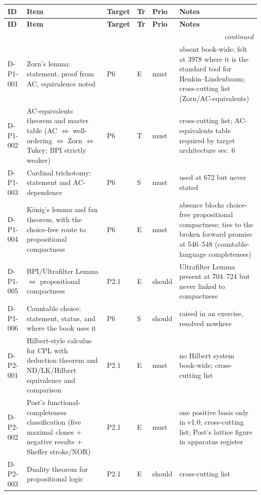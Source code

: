 \begingroup\scriptsize\setlength{\tabcolsep}{3pt}
\begin{longtable}{@{}p{0.62in}p{2.6in}p{0.75in}p{0.22in}p{0.42in}p{1.85in}@{}}
\toprule
\textbf{ID} & \textbf{Item} & \textbf{Target} & \textbf{Tr} & \textbf{Prio} & \textbf{Notes} \\
\midrule
\endfirsthead
\toprule
\textbf{ID} & \textbf{Item} & \textbf{Target} & \textbf{Tr} & \textbf{Prio} & \textbf{Notes} \\
\midrule
\endhead
\midrule\multicolumn{6}{r}{\emph{continued}}\\\endfoot
\bottomrule\endlastfoot
D-P1-001 & Zorn's lemma: statement, proof from AC, equivalence noted & P6 & E & must & absent book-wide; felt at 3978 where it is the standard tool for Henkin--Lindenbaum; cross-cutting list (Zorn/AC-equivalents) \\
D-P1-002 & AC-equivalents theorem and master table (AC \(\Leftrightarrow\) well-ordering \(\Leftrightarrow\) Zorn \(\Leftrightarrow\) Tukey; BPI strictly weaker) & P6 & T & must & cross-cutting list; AC-equivalents table required by target architecture sec. 6 \\
D-P1-003 & Cardinal trichotomy: statement and AC-dependence & P6 & S & must & used at 672 but never stated \\
D-P1-004 & K\"onig's lemma and fan theorem, with the choice-free route to propositional compactness & P6 & E & must & absence blocks choice-free propositional compactness; ties to the broken forward promise at 546--548 (countable-language completeness) \\
D-P1-005 & BPI/Ultrafilter Lemma \(\Leftrightarrow\) propositional compactness & P2.1 & E & should & Ultrafilter Lemma present at 704--724 but never linked to compactness \\
D-P1-006 & Countable choice: statement, status, and where the book uses it & P6 & S & should & raised in an exercise, resolved nowhere \\
D-P2-001 & Hilbert-style calculus for CPL with deduction theorem and ND/LK/Hilbert equivalence and comparison & P2.1 & E & must & no Hilbert system book-wide; cross-cutting list \\
D-P2-002 & Post's functional-completeness classification (five maximal clones + negative results + Sheffer stroke/NOR) & P2.1 & E & must & one positive basis only in v1.0; cross-cutting list; Post's lattice figure in apparatus register \\
D-P2-003 & Duality theorem for propositional logic & P2.1 & E & should & cross-cutting list \\

\end{longtable}
